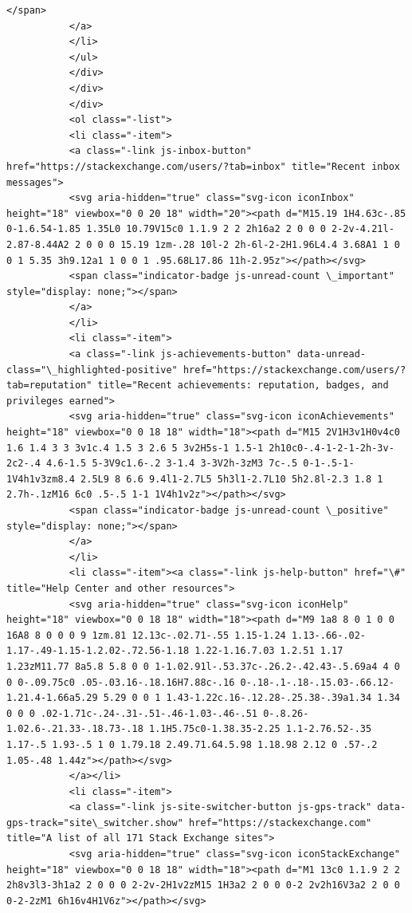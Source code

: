 \documentclass[11pt]{article}
\begin{document}
\begin{Verbatim}[commandchars=\\\{\}]
                                           </span>
           </a>
           </li>
           </ul>
           </div>
           </div>
           </div>
           <ol class="-list">
           <li class="-item">
           <a class="-link js-inbox-button" href="https://stackexchange.com/users/?tab=inbox" title="Recent inbox messages">
           <svg aria-hidden="true" class="svg-icon iconInbox" height="18" viewbox="0 0 20 18" width="20"><path d="M15.19 1H4.63c-.85 0-1.6.54-1.85 1.35L0 10.79V15c0 1.1.9 2 2 2h16a2 2 0 0 0 2-2v-4.21l-2.87-8.44A2 2 0 0 0 15.19 1zm-.28 10l-2 2h-6l-2-2H1.96L4.4 3.68A1 1 0 0 1 5.35 3h9.12a1 1 0 0 1 .95.68L17.86 11h-2.95z"></path></svg>
           <span class="indicator-badge js-unread-count \_important" style="display: none;"></span>
           </a>
           </li>
           <li class="-item">
           <a class="-link js-achievements-button" data-unread-class="\_highlighted-positive" href="https://stackexchange.com/users/?tab=reputation" title="Recent achievements: reputation, badges, and privileges earned">
           <svg aria-hidden="true" class="svg-icon iconAchievements" height="18" viewbox="0 0 18 18" width="18"><path d="M15 2V1H3v1H0v4c0 1.6 1.4 3 3 3v1c.4 1.5 3 2.6 5 3v2H5s-1 1.5-1 2h10c0-.4-1-2-1-2h-3v-2c2-.4 4.6-1.5 5-3V9c1.6-.2 3-1.4 3-3V2h-3zM3 7c-.5 0-1-.5-1-1V4h1v3zm8.4 2.5L9 8 6.6 9.4l1-2.7L5 5h3l1-2.7L10 5h2.8l-2.3 1.8 1 2.7h-.1zM16 6c0 .5-.5 1-1 1V4h1v2z"></path></svg>
           <span class="indicator-badge js-unread-count \_positive" style="display: none;"></span>
           </a>
           </li>
           <li class="-item"><a class="-link js-help-button" href="\#" title="Help Center and other resources">
           <svg aria-hidden="true" class="svg-icon iconHelp" height="18" viewbox="0 0 18 18" width="18"><path d="M9 1a8 8 0 1 0 0 16A8 8 0 0 0 9 1zm.81 12.13c-.02.71-.55 1.15-1.24 1.13-.66-.02-1.17-.49-1.15-1.2.02-.72.56-1.18 1.22-1.16.7.03 1.2.51 1.17 1.23zM11.77 8a5.8 5.8 0 0 1-1.02.91l-.53.37c-.26.2-.42.43-.5.69a4 4 0 0 0-.09.75c0 .05-.03.16-.18.16H7.88c-.16 0-.18-.1-.18-.15.03-.66.12-1.21.4-1.66a5.29 5.29 0 0 1 1.43-1.22c.16-.12.28-.25.38-.39a1.34 1.34 0 0 0 .02-1.71c-.24-.31-.51-.46-1.03-.46-.51 0-.8.26-1.02.6-.21.33-.18.73-.18 1.1H5.75c0-1.38.35-2.25 1.1-2.76.52-.35 1.17-.5 1.93-.5 1 0 1.79.18 2.49.71.64.5.98 1.18.98 2.12 0 .57-.2 1.05-.48 1.44z"></path></svg>
           </a></li>
           <li class="-item">
           <a class="-link js-site-switcher-button js-gps-track" data-gps-track="site\_switcher.show" href="https://stackexchange.com" title="A list of all 171 Stack Exchange sites">
           <svg aria-hidden="true" class="svg-icon iconStackExchange" height="18" viewbox="0 0 18 18" width="18"><path d="M1 13c0 1.1.9 2 2 2h8v3l3-3h1a2 2 0 0 0 2-2v-2H1v2zM15 1H3a2 2 0 0 0-2 2v2h16V3a2 2 0 0 0-2-2zM1 6h16v4H1V6z"></path></svg>

\end{Verbatim}
\end{document}
